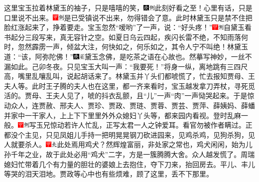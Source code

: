 这里宝玉拉着林黛玉的袖子，只是嘻嘻的笑，{\includegraphics[width=3mm]{../Images/00004}\includegraphics[width=3mm]{../Images/00011}\footnotesize \kaishu 此刻好看之至！}心里有话，只是口里说不出来。{\includegraphics[width=3mm]{../Images/00002}\includegraphics[width=3mm]{../Images/00011}\footnotesize \kaishu 是已受镇说不出来，勿得错会了意。}此时林黛玉只是禁不住把脸红涨起来了，挣着要走。宝玉忽然“嗳哟”了一声，说：“好头疼！”{\includegraphics[width=3mm]{../Images/00002}\includegraphics[width=3mm]{../Images/00011}\footnotesize \kaishu 自黛玉看书起分三段写来，真无容针之空。如夏日乌云四起，疾闪长雷不绝，不知雨落何时，忽然霹雳一声，倾盆大注，何快如之，何乐如之，其令人宁不叫绝！}林黛玉道：“该，阿弥陀佛！”{\includegraphics[width=3mm]{../Images/00004}\includegraphics[width=3mm]{../Images/00010}\footnotesize \kaishu 黛玉念佛，是吃茶之语在心故也。然摹写神妙，一丝不漏如此。己卯冬夜。}只见宝玉大叫一声：“我要死！”将身一纵，离地跳有三四尺高，嘴里乱嚷乱叫，说起胡话来了。林黛玉并丫头们都唬慌了，忙去报知贾母、王夫人等。此时王子腾的夫人也在这里，都一齐来看时，宝玉越发拿刀弄杖，寻死觅活的。贾母、王夫人见了，唬的抖衣乱颤，且“儿”一声“肉”一声恸哭起来。于是惊动众人，连贾赦、邢夫人、贾珍、贾政、贾琏、贾蓉、贾芸、贾萍、薛姨妈、薛蟠并家中一干家人，上上下下里里外外众媳妇丫头等，都来园内看视。登时乱麻一般。{\includegraphics[width=3mm]{../Images/00002}\includegraphics[width=3mm]{../Images/00011}\footnotesize \kaishu 写玉兄惊动若许人忙乱，正写太君一人之钟爱耳。看官勿被作者瞒过。}正都没个主见，只见凤姐儿手持一把明晃晃钢刀砍进园来，见鸡杀鸡，见狗杀狗，见人就要杀人。{\includegraphics[width=3mm]{../Images/00002}\includegraphics[width=3mm]{../Images/00012}\footnotesize \kaishu 此处焉用鸡犬？然辉煌富丽，非处家之常也，鸡犬闲闲，始为儿孙千年之业，故于此处必用“鸡犬”二字，方是一簇腾腾大舍。}众人越发慌了。周瑞媳妇忙带着几个有力量的胆壮的婆娘上去抱住，夺下刀来，抬回房去。平儿、丰儿等哭的泪天泪地。贾政等心中也有些烦难，顾了这里，丢不下那里。

